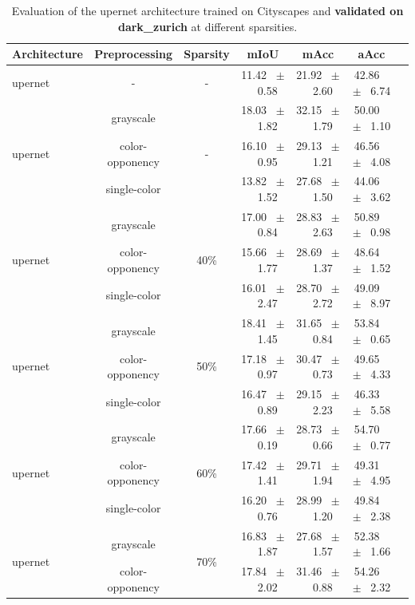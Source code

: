 \begin{table}[h]
  \centering
  \caption{Evaluation of the upernet architecture trained on Cityscapes and \textbf{validated on dark_zurich} at different sparsities.}
  \begin{tabular}{@{}lccc ccc@{}}
    \toprule
    Architecture & Preprocessing & Sparsity & mIoU & mAcc & aAcc \\
    \midrule
    upernet & - & - & 11.42 ~$\pm$~ 0.58 & 21.92 ~$\pm$~ 2.60 & 42.86 ~$\pm$~ 6.74 \\
    \midrule
    \midrule
    \multirow{3}{*}{upernet} & grayscale & \multirow{3}{*}{-} & 18.03 ~$\pm$~ 1.82 & 32.15 ~$\pm$~ 1.79 & 50.00 ~$\pm$~ 1.10 \\
    & color-opponency & & 16.10 ~$\pm$~ 0.95 & 29.13 ~$\pm$~ 1.21 & 46.56 ~$\pm$~ 4.08 \\
    & single-color & & 13.82 ~$\pm$~ 1.52 & 27.68 ~$\pm$~ 1.50 & 44.06 ~$\pm$~ 3.62 \\
    \midrule
    \multirow{3}{*}{upernet} & grayscale & \multirow{3}{*}{40\%} & 17.00 ~$\pm$~ 0.84 & 28.83 ~$\pm$~ 2.63 & 50.89 ~$\pm$~ 0.98 \\
    & color-opponency & & 15.66 ~$\pm$~ 1.77 & 28.69 ~$\pm$~ 1.37 & 48.64 ~$\pm$~ 1.52 \\
    & single-color & & 16.01 ~$\pm$~ 2.47 & 28.70 ~$\pm$~ 2.72 & 49.09 ~$\pm$~ 8.97 \\
    \midrule
    \multirow{3}{*}{upernet} & grayscale & \multirow{3}{*}{50\%} & 18.41 ~$\pm$~ 1.45 & 31.65 ~$\pm$~ 0.84 & 53.84 ~$\pm$~ 0.65 \\
    & color-opponency & & 17.18 ~$\pm$~ 0.97 & 30.47 ~$\pm$~ 0.73 & 49.65 ~$\pm$~ 4.33 \\
    & single-color & & 16.47 ~$\pm$~ 0.89 & 29.15 ~$\pm$~ 2.23 & 46.33 ~$\pm$~ 5.58 \\
    \midrule
    \multirow{3}{*}{upernet} & grayscale & \multirow{3}{*}{60\%} & 17.66 ~$\pm$~ 0.19 & 28.73 ~$\pm$~ 0.66 & 54.70 ~$\pm$~ 0.77 \\
    & color-opponency & & 17.42 ~$\pm$~ 1.41 & 29.71 ~$\pm$~ 1.94 & 49.31 ~$\pm$~ 4.95 \\
    & single-color & & 16.20 ~$\pm$~ 0.76 & 28.99 ~$\pm$~ 1.20 & 49.84 ~$\pm$~ 2.38 \\
    \midrule
    \multirow{3}{*}{upernet} & grayscale & \multirow{3}{*}{70\%} & 16.83 ~$\pm$~ 1.87 & 27.68 ~$\pm$~ 1.57 & 52.38 ~$\pm$~ 1.66 \\
    & color-opponency & & 17.84 ~$\pm$~ 2.02 & 31.46 ~$\pm$~ 0.88 & 54.26 ~$\pm$~ 2.32 \\

\end{tabular}
\end{table}
